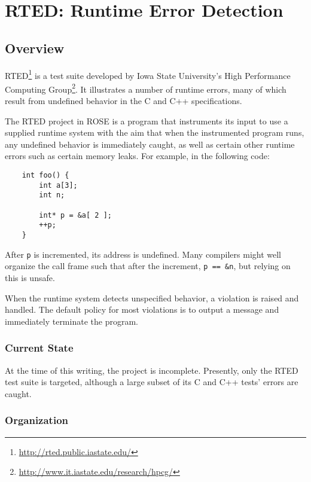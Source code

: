 
\chapter{RTED: Runtime Error Detection} %

\label{RTED}


\section{Overview}%

RTED\footnote{\url{http://rted.public.iastate.edu/}} is a test suite
developed by Iowa State University's High Performance Computing
Group\footnote{\url{http://www.it.iastate.edu/research/hpcg/}}.  It illustrates
a number of runtime errors, many of which result from undefined behavior in the
C and C++ specifications.

The RTED project in ROSE is a program that instruments its input to use
a supplied runtime system with the aim that when the instrumented program runs,
any undefined behavior is immediately caught, as well as certain other runtime
errors such as certain memory leaks.  For example, in the following code:

\begin{verbatim}
    int foo() {
        int a[3];
        int n;

        int* p = &a[ 2 ];
        ++p;
    }
\end{verbatim}

After \texttt{p} is incremented, its address is undefined.  Many compilers might
well organize the call frame such that after the increment, \texttt{p == \&n},
but relying on this is unsafe.

When the runtime system detects unspecified behavior, a violation is raised and
handled.  The default policy for most violations is to output a message and
immediately terminate the program.


\subsection{Current State}

At the time of this writing, the project is incomplete.  Presently, only the
RTED test suite is targeted, although a large subset of its C and C++
tests' errors are caught.


\subsection{Organization}

